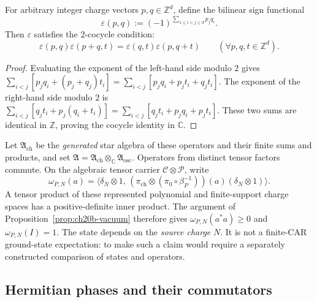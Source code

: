 \begin{theorem}
\label{thm:ch20b-cocycle-identity}
For arbitrary integer charge vectors $p, q \in \mathbb Z^d$, define the bilinear sign functional
\begin{equation}
 \varepsilon(p, q) := (-1)^{\sum_{1 \le i < j \le d} p_j q_i}.
 \label{eq:ch20b-cocycle-general}
\end{equation}
Then $\varepsilon$ satisfies the 2-cocycle condition:
\begin{equation}
 \varepsilon(p, q) \varepsilon(p+q, t) = \varepsilon(q, t) \varepsilon(p, q+t)
 \qquad (\forall p, q, t \in \mathbb Z^d).
 \label{eq:ch20b-cocycle-identity}
\end{equation}
\end{theorem}
\begin{proof}
Evaluating the exponent of the left-hand side modulo $2$ gives
$\sum_{i<j} [ p_j q_i + (p_j + q_j) t_i ] = \sum_{i<j} [ p_j q_i + p_j t_i + q_j t_i ]$.
The exponent of the right-hand side modulo $2$ is
$\sum_{i<j} [ q_j t_i + p_j (q_i + t_i) ] = \sum_{i<j} [ q_j t_i + p_j q_i + p_j t_i ]$.
These two sums are identical in $\mathbb Z$, proving the cocycle identity in $\mathbb C$.
\end{proof}

Let \(\mathfrak A_{\mathrm{ch}}\) be the \emph{generated} star algebra of
these operators and their finite sums and products, and set
\(\mathfrak A=\mathfrak A_{\mathrm{ch}}\otimes_{\mathbb C}
\mathfrak A_{\mathrm{osc}}\).  Operators from distinct tensor factors
commute.  On the algebraic tensor carrier
\(\mathcal C\otimes\mathcal P\), write
\begin{equation}
 \omega_{P,N}(a)=
 \big\langle\delta_N\otimes1,\,
      (\pi_{\mathrm{ch}}\otimes(\pi_0\circ\beta_P^{-1}))(a)
      (\delta_N\otimes1)\big\rangle.
 \label{eq:ch20b-tensor-state}
\end{equation}
A tensor product of these represented polynomial and finite-support
charge spaces has a positive-definite inner product.  The argument of
Proposition~\ref{prop:ch20b-vacuum} therefore gives
\(\omega_{P,N}(a^*a)\geq0\) and \(\omega_{P,N}(I)=1\).
The state depends on the \emph{source charge} \(N\).  It is not a
finite-CAR ground-state expectation: to make such a claim would require
a separately constructed comparison of states and operators.

\subsection{Hermitian phases and their commutators}
\label{subsec:ch20b-phases}


